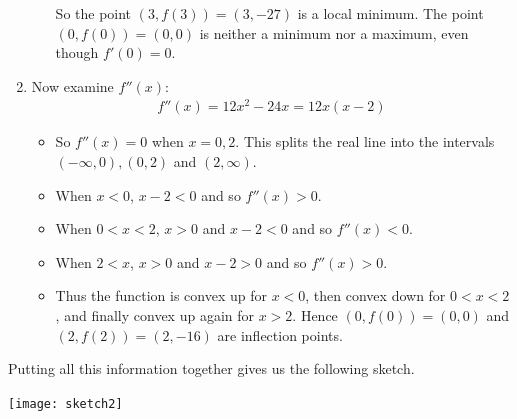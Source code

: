 \begin{eg}[Sketch $f(x)=x^4-4x^3$]
\begin{enumerate}[(1)]
\begin{itemize}
So the point $(3,f(3))=(3,-27)$ is a local minimum. The point $(0,f(0))=(0,0)$
is neither a minimum nor a maximum, even though $f'(0)=0$.
\end{itemize}
\item Now examine $f''(x)$:
\begin{align*}
f''(x) = 12x^2-24x=12x(x-2)
\end{align*}
\begin{itemize}
\item So $f''(x)=0$ when $x=0,2$. This splits the real line into the intervals
$(-\infty,0),(0,2)$ and $(2,\infty)$.
 \item When $x<0$, $x-2<0$ and so $f''(x)>0$.
 \item When $0<x<2$, $x>0$ and $x-2<0$ and so $f''(x)<0$.
 \item When $2<x$, $x>0$ and $x-2>0$ and so $f''(x)>0$.
\item Thus the function is convex up for $x<0$, then convex down for $0<x<2$, and finally
convex up again for $x>2$. Hence $(0,f(0))=(0,0)$ and $(2,f(2))=(2,-16)$ are inflection
points.
\end{itemize}
\end{enumerate}
Putting all this information together gives us the following sketch.
\begin{efig}
\begin{center}
   \texttt{[image: sketch2]}
\end{center}
\end{efig}
\end{eg}

